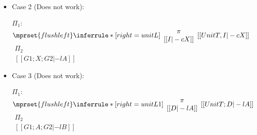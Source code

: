 \begin{itemize}
\item Case 2 (Does not work):
      \begin{center}
        \scriptsize
        $\Pi_1$:
        \begin{math}
          $$\mprset{flushleft}
          \inferrule* [right={\tiny unitL}] {
            {
              \begin{array}{c}
                \pi \\
                {[[I |-c X]]}
              \end{array}
            }
          }{[[UnitT, I |-c X]]}
        \end{math}
        \qquad\qquad
        \begin{math}
          \begin{array}{c}
            \Pi_2 \\
            {[[G1; X; G2 |-l A]]}
          \end{array}
        \end{math}
      \end{center}

\item Case 3 (Does not work):
      \begin{center}
        \scriptsize
        $\Pi_1$:
        \begin{math}
          $$\mprset{flushleft}
          \inferrule* [right={\tiny unitL1}] {
            {
              \begin{array}{c}
                \pi \\
                {[[D |-l A]]}
              \end{array}
            }
          }{[[UnitT; D |-l A]]}
        \end{math}
        \qquad\qquad
        \begin{math}
          \begin{array}{c}
            \Pi_2 \\
            {[[G1; A; G2 |-l B]]}
          \end{array}
        \end{math}
      \end{center}
\end{itemize}



